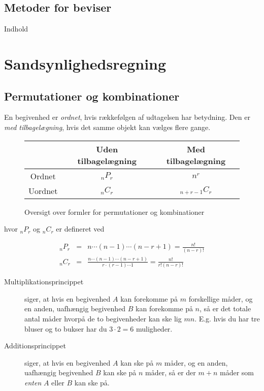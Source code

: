 \documentclass[a4paper]{article}
\begin{document}
  \subsection{Metoder for beviser}
    Indhold

\section{Sandsynlighedsregning}

\subsection{Permutationer og kombinationer}
En begivenhed er {\it ordnet}, hvis rækkefølgen af udtagelsen har betydning. Den er
{\it med tilbagelægning}, hvis det samme objekt kan vælges flere gange.

\begin{figure}[h!]
    \begin{center}
    \begin{tabular}{|c|c|c|}
        \hline
        & Uden tilbagelægning & Med tilbagelægning \\
        \hline
        Ordnet  & $_nP_r$ & $n^r$ \\
        \hline
        Uordnet & $_nC_r$ & $_{n+r-1}C_r$ \\
        \hline
    \end{tabular}
    \end{center}
    \caption{Oversigt over formler for permutationer og kombinationer} \label{fig:perm}
\end{figure}

hvor $_nP_r$ og $_nC_r$ er defineret ved

\begin{eqnarray*}
    _nP_r &=& n\cdots{}(n-1)\cdots{}(n-r+1) = \frac{n!}{(n-r)!} \\
    _nC_r &=& \frac{n\cdots (n-1) \cdots (n-r+1)}{r\cdot (r-1)\cdots 1} = \frac{n!}{r!(n-r)!}
\end{eqnarray*}

\begin{description}

\item[Multiplikationsprincippet] siger, at hvis en begivenhed $A$ kan forekomme på $m$ forskellige
måder, og en anden, uafhængig begivenhed $B$ kan forekomme på $n$, så er det totale antal måder
hvorpå de to begivenheder kan ske lig $mn$. E.g. hvis du har tre bluser og to bukser har du
$3 \cdot 2 = 6$ muligheder.

\item[Additionsprincippet] siger, at hvis en begivenhed $A$ kan ske på $m$ måder, og en anden,
uafhængig begivenhed $B$ kan ske på $n$ måder, så er der $m + n$ måder som {\it enten} $A$ eller $B$
kan ske på.

\end{description}
\end{document}
